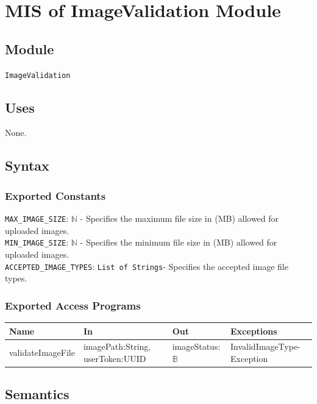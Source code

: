 \documentclass[12pt, titlepage]{article}
\begin{document}
\section{MIS of ImageValidation Module} \label{Module: ImageValid}

\subsection{Module}
\texttt{ImageValidation}

\subsection{Uses}
None.
\subsection{Syntax}

\subsubsection{Exported Constants}
\texttt{MAX\_IMAGE\_SIZE}: $\mathbb{N}$ - Specifies the maximum file
size in (MB) allowed for uploaded images.\\
\texttt{MIN\_IMAGE\_SIZE}: $\mathbb{N}$ - Specifies the minimum file
size in (MB) allowed for uploaded images.\\
\texttt{ACCEPTED\_IMAGE\_TYPES}: \texttt{List of Strings}- Specifies
the accepted image file types.
\subsubsection{Exported Access Programs}

\begin{center}
  \begin{tabular}{p{4 cm} p{5cm} p{3 cm} p{4cm}}
    \hline
    \textbf{Name} & \textbf{In} & \textbf{Out} & \textbf{Exceptions} \\
    \hline
    validateImageFile & imagePath:String, userToken:UUID &
    imageStatus: \(\mathbb{B}\)& InvalidImageType-Exception \\
    \hline
  \end{tabular}
\end{center}

\subsection{Semantics}
\end{document}
